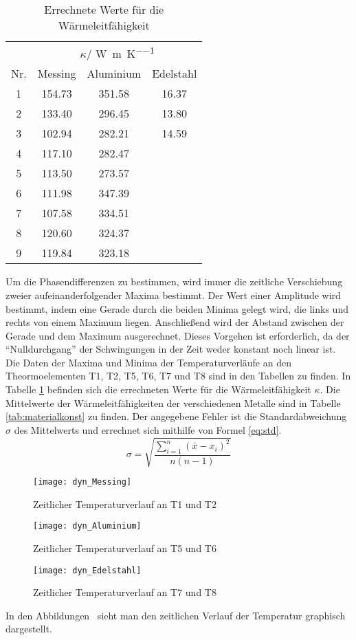 \begin{table}
  \centering
  \begin{tabular}{c|c|c|c}
    \toprule
	   &\multicolumn{3}{c}{$\kappa$/ \si{\watt\per\metre\per\kelvin}} \\
    Nr. & Messing& Aluminium& Edelstahl\\
    \midrule
    1 & 154.73 & 351.58&16.37\\
    2 & 133.40& 296.45&13.80\\
    3 & 102.94 &282.21&14.59\\
    4 & 117.10 & 282.47&\\
    5 &  113.50& 273.57&\\
    6 &111.98& 347.39&\\
    7 & 107.58& 334.51&\\
    8 & 120.60& 324.37&\\
    9 & 119.84& 323.18&\\
    \bottomrule
  \end{tabular}
  \caption{Errechnete Werte für die Wärmeleitfähigkeit}
  \label{tab:kappa}
\end{table}
Um die Phasendifferenzen zu bestimmen, wird immer die zeitliche
Verschiebung zweier aufeinanderfolgender Maxima bestimmt. Der Wert einer
Amplitude wird bestimmt, indem eine Gerade durch die beiden Minima
gelegt wird, die links und rechts von einem Maximum liegen. Anschließend
wird der Abstand zwischen der Gerade und dem Maximum
ausgerechnet. Dieses Vorgehen ist erforderlich, da der
\enquote{Nulldurchgang} der Schwingungen in der Zeit weder konstant noch
linear ist. Die Daten der Maxima und Minima der Temperaturverläufe an den Theormoelementen T1, T2, T5, T6, T7 und T8 sind in den Tabellen  zu finden. In Tabelle \ref{tab:kappa} befinden sich die errechneten Werte für die Wärmeleitfähigkeit $\kappa$. Die Mittelwerte der Wärmeleitfähigkeiten der verschiedenen Metalle sind in Tabelle \ref{tab:materialkonst} zu finden. Der angegebene Fehler ist die Standardabweichung $\sigma$ des Mittelwerts und errechnet sich mithilfe von Formel \eqref{eq:std}.
\begin{equation}
\label{eq:std}
\sigma = \sqrt{\frac{\sum\limits_{i=1}^{n}(\bar{x} - x_i)^2}{n(n-1)}} 
\end{equation}
\begin{figure}
  \centering
  \texttt{[image: dyn\_Messing]}
  \caption{Zeitlicher Temperaturverlauf an T1 und T2}
  \label{fig:dyn_messing}
\end{figure}

\begin{figure}
  \centering
  \texttt{[image: dyn\_Aluminium]}
  \caption{Zeitlicher Temperaturverlauf an T5 und T6}
  \label{fig:dyn_aluminium}
\end{figure}

\begin{figure}
  \centering
  \texttt{[image: dyn\_Edelstahl]}
  \caption{Zeitlicher Temperaturverlauf an T7 und T8}
  \label{fig:dyn_edelstahl}
\end{figure}

In den Abbildungen~ sieht
man den zeitlichen Verlauf der Temperatur graphisch dargestellt.
